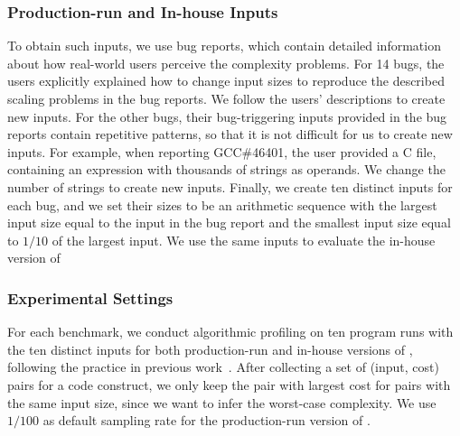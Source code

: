 \subsubsection{Production-run and In-house Inputs}

To obtain such inputs, we use bug reports, 
which contain detailed information about how real-world 
users perceive the complexity problems. 
For 14 bugs, 
the users explicitly explained how to change input sizes 
to reproduce the described scaling problems in the bug reports. 
We follow the users' descriptions to create new inputs. 
For the other bugs, their bug-triggering inputs provided 
in the bug reports contain repetitive patterns, 
so that it is not difficult for us to create new inputs.
For example, when reporting GCC\#46401,
the user provided a C file, 
containing an expression with thousands of strings as operands. 
We change the number of strings to create new inputs. 
Finally, we create ten distinct inputs for each bug, 
and we set their sizes 
to be an arithmetic sequence with the largest input size
equal to the input in the bug report and the 
smallest input size equal to $1/10$ 
of the largest input.
We use the same inputs to evaluate the in-house version of \Tool
{}







\subsubsection{Experimental Settings}

For each benchmark, we conduct algorithmic profiling on ten 
program runs with the ten distinct inputs for both production-run 
and in-house versions of \Tool, following the practice in 
previous work~\cite{joy.asplos13,SongOOPSLA2014}.
After collecting a set of (input, cost) pairs for a code construct,
we only keep the pair with largest cost for pairs with the same input size,
since we want to infer the worst-case complexity.
We use $1/100$ as default sampling rate for the production-run version of \Tool.


